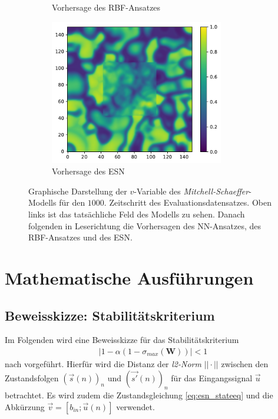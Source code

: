 \begin{appendices}
\begin{figure}[h]
\begin{subfigure}{.5\textwidth}
		\setcapmargin[1cm]{0.5cm}
  		\caption{Vorhersage des \textsc{RBF}-Ansatzes}
	\end{subfigure}%
	\begin{subfigure}{.5\textwidth}
		\centering
		\includegraphics[height=2.5in]{figures/results/inner_cross_prediction/mitchell_v_inner_esn.pdf}
		\setcapmargin[1cm]{0.5cm}
  		\caption{Vorhersage des \textsc{ESN}}
	\end{subfigure}
	\caption{Graphische Darstellung der $v$-Variable des \textit{Mitchell-Schaeffer}-Modells für den $1000$. Zeitschritt des Evaluationsdatensatzes. Oben links ist das tatsächliche Feld des Modells zu sehen. Danach folgenden in Leserichtung die Vorhersagen des \textsc{NN}-Ansatzes, des \textsc{RBF}-Ansatzes und des \textsc{ESN}.}
	\label{fig:apx_inner_cross_mitchell_result}
\end{figure} 

\end{appendices}


\chapter{Mathematische Ausführungen}
\section{Beweisskizze: Stabilitätskriterium}
\label{sc:apx_math_stability_proof}
Im Folgenden wird eine Beweisskizze für das Stabilitätskriterium
\begin{align*}
|1-\alpha(1-\sigma_{max}(\mathbf{W}))| < 1
\end{align*}
nach \cite{jaeger2010} vorgeführt. Hierfür wird die Distanz der \textit{l2-Norm} $||\cdot||$ zwischen den Zustandsfolgen $(\vec{s}(n))_n$ und $(\vec{s'}(n))_n$ für das Eingangssignal $\vec{u}$ betrachtet. Es wird zudem die Zustandsgleichung \ref{eq:esn_stateeq} und die Abkürzung $\vec{v} = [b_{in}; \vec{u}(n)]$ verwendet. 

